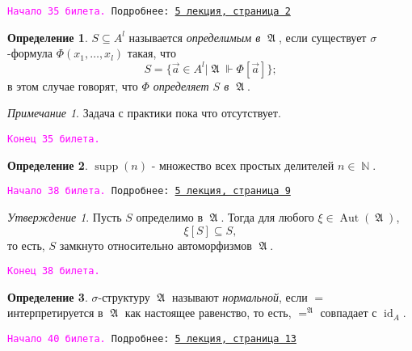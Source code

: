 \documentclass[a4paper,100pt]{article}
\theoremstyle{indented}
\theoremstyle{definition}
\newtheorem{defn}{Определение}
\theoremstyle{remark}
\newtheorem{remark}{Примечание}
\newtheorem{stat}{Утверждение}
\DeclareMathOperator{\id}{id}
\DeclareMathOperator{\NN}{\mathbb{N}}
\DeclareMathOperator{\Aut}{Aut}
\DeclareMathOperator{\supp}{supp}
\DeclareMathOperator{\GA}{\mathfrak{A}}
\begin{document}
\hrulefill

\texttt{\hypertarget{b35}{\textcolor{magenta}{Начало 35 билета.}} Подробнее: \href{http://www.mi-ras.ru/~speranski/courses/logic-1-2021-spring/slides_5.pdf}{5 лекция, страница 2}} \\

\begin{defn}
  $S\subseteq A^l$ называется \textit{определимым в $\GA$}, если существует $\sigma$-формула $\Phi(x_1, \ldots, x_l)$ такая, что 
  \[
    S=\{\vec{a}\in A^l|\GA\Vdash \Phi[\vec{a}]\}; 
  \]
  в этом случае говорят, что \textit{$\Phi$ определяет $S$ в $\GA$}. 
\end{defn}

\begin{remark}
  Задача с практики пока что отсутствует.
\end{remark}

\texttt{\textcolor{magenta}{Конец 35 билета.}} 

\hrulefill

\begin{defn}
  $\supp(n)$ - множество всех простых делителей $n\in \NN$. 
\end{defn}

\hrulefill

\texttt{\hypertarget{b38}{\textcolor{magenta}{Начало 38 билета.}} Подробнее: \href{http://www.mi-ras.ru/~speranski/courses/logic-1-2021-spring/slides_5.pdf}{5 лекция, страница 9}} 

\begin{stat}
  Пусть $S$ определимо в $\GA$. Тогда для любого $\xi\in \Aut(\GA)$, 
  \[
    \xi[S]\subseteq S, 
  \]
  то есть, $S$ замкнуто относительно автоморфизмов $\GA$. 
\end{stat}

\texttt{\textcolor{magenta}{Конец 38 билета.}} 

\hrulefill

\begin{defn}
  $\sigma$-структуру $\GA$ называют \textit{нормальной}, если $=$ интерпретируется в $\GA$ как настоящее равенство, то есть, $=^{\GA}$ совпадает с $\id_A$.
\end{defn}

\hrulefill

\texttt{\hypertarget{b40}{\textcolor{magenta}{Начало 40 билета.}} Подробнее: \href{http://www.mi-ras.ru/~speranski/courses/logic-1-2021-spring/slides_5.pdf}{5 лекция, страница 13}} 
\end{document}
